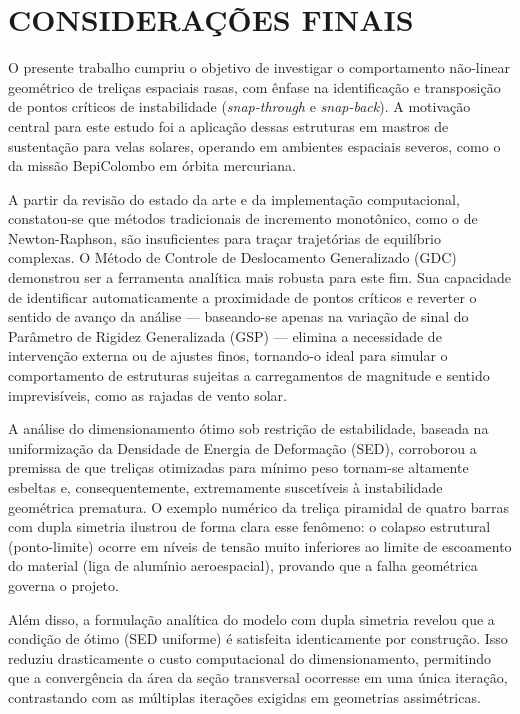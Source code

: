 


\section{CONSIDERAÇÕES FINAIS}
\label{sec:conclusao}

O presente trabalho cumpriu o objetivo de investigar o comportamento não-linear geométrico de treliças espaciais rasas, com ênfase na identificação e transposição de pontos críticos de instabilidade (\textit{snap-through} e \textit{snap-back}). A motivação central para este estudo foi a aplicação dessas estruturas em mastros de sustentação para velas solares, operando em ambientes espaciais severos, como o da missão BepiColombo em órbita mercuriana.

A partir da revisão do estado da arte e da implementação computacional, constatou-se que métodos tradicionais de incremento monotônico, como o de Newton-Raphson, são insuficientes para traçar trajetórias de equilíbrio complexas. O Método de Controle de Deslocamento Generalizado (GDC) demonstrou ser a ferramenta analítica mais robusta para este fim. Sua capacidade de identificar automaticamente a proximidade de pontos críticos e reverter o sentido de avanço da análise — baseando-se apenas na variação de sinal do Parâmetro de Rigidez Generalizada (GSP) — elimina a necessidade de intervenção externa ou de ajustes finos, tornando-o ideal para simular o comportamento de estruturas sujeitas a carregamentos de magnitude e sentido imprevisíveis, como as rajadas de vento solar.

A análise do dimensionamento ótimo sob restrição de estabilidade, baseada na uniformização da Densidade de Energia de Deformação (SED), corroborou a premissa de que treliças otimizadas para mínimo peso tornam-se altamente esbeltas e, consequentemente, extremamente suscetíveis à instabilidade geométrica prematura. O exemplo numérico da treliça piramidal de quatro barras com dupla simetria ilustrou de forma clara esse fenômeno: o colapso estrutural (ponto-limite) ocorre em níveis de tensão muito inferiores ao limite de escoamento do material (liga de alumínio aeroespacial), provando que a falha geométrica governa o projeto.

Além disso, a formulação analítica do modelo com dupla simetria revelou que a condição de ótimo (SED uniforme) é satisfeita identicamente por construção. Isso reduziu drasticamente o custo computacional do dimensionamento, permitindo que a convergência da área da seção transversal ocorresse em uma única iteração, contrastando com as múltiplas iterações exigidas em geometrias assimétricas.

